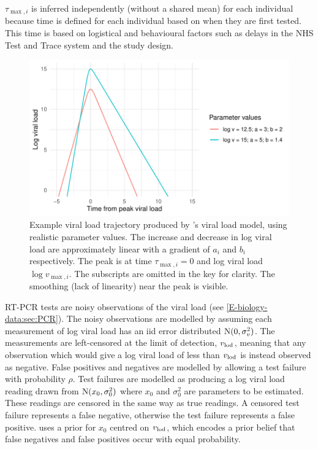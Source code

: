 \documentclass[thesis.tex]{subfiles}
\begin{document}
$\tau_{\max,i}$ is inferred independently (\ie without a shared mean) for each individual because time is defined for each individual based on when they are first tested.
This time is based on logistical and behavioural factors such as delays in the NHS Test and Trace system and the study design.
\begin{figure}[tbhp]
  \centering \includegraphics{ATACCC/typical_trajectory}
  \caption[Example viral load model trajectory.]{%
    Example viral load trajectory produced by \textcite{hakkiOnset}'s viral load model, using realistic parameter values.
    The increase and decrease in log viral load are approximately linear with a gradient of $a_i$ and $b_i$ respectively.
    The peak is at time $\tau_{\max,i} = 0$ and log viral load $\log v_{\max,i}$.
    The subscripts are omitted in the key for clarity.
    The smoothing (lack of linearity) near the peak is visible. \label{ATACCC:fig:viral-load-model}
  }
\end{figure}

RT-PCR tests are noisy observations of the viral load (see \cref{E-biology-data:sec:PCR}).
The noisy observations are modelled by assuming each measurement of log viral load has an iid error distributed $\operatorname{N}(0, \sigma_v^2)$.
The measurements are left-censored at the limit of detection, $v_\text{lod}$, meaning that any observation which would give a log viral load of less than $v_\text{lod}$ is instead observed as negative.
False positives and negatives are modelled by allowing a test failure with probability $\rho$.
Test failures are modelled as producing a log viral load reading drawn from $\operatorname{N}(x_0, \sigma_0^2)$ where $x_0$ and $\sigma_0^2$ are parameters to be estimated.
These readings are censored in the same way as true readings.
A censored test failure represents a false negative, otherwise the test failure represents a false positive.
\textcite{hakkiOnset} uses a prior for $x_0$ centred on $v_\text{lod}$, which encodes a prior belief that false negatives and false positives occur with equal probability.
\end{document}
